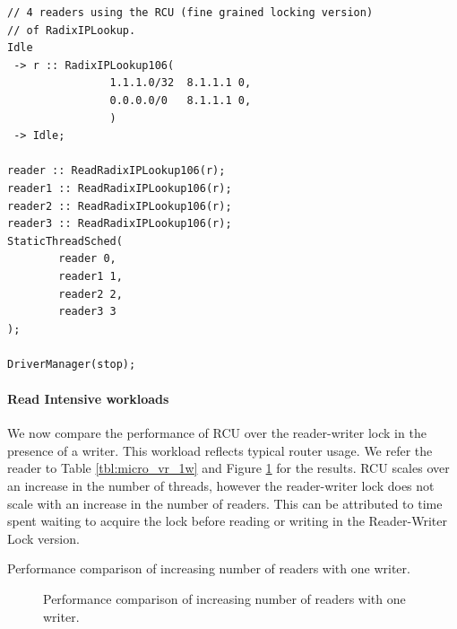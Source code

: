 \documentclass[12pt,a4paper]{article}
\begin{document}
\begin{lstlisting}[float=tph, caption = A Click configuration file for 4 readers, label =lst:readercomparison]
// 4 readers using the RCU (fine grained locking version)
// of RadixIPLookup.
Idle
 -> r :: RadixIPLookup106(
                1.1.1.0/32  8.1.1.1 0,
                0.0.0.0/0   8.1.1.1 0,
                ) 
 -> Idle;

reader :: ReadRadixIPLookup106(r);
reader1 :: ReadRadixIPLookup106(r);
reader2 :: ReadRadixIPLookup106(r);
reader3 :: ReadRadixIPLookup106(r);
StaticThreadSched(
        reader 0,
        reader1 1,
        reader2 2,
        reader3 3
);

DriverManager(stop);

\end{lstlisting}

\paragraph{Read Intensive workloads}
We now compare the performance of RCU over the reader-writer lock in the presence of a writer. This workload reflects typical router usage. We refer the reader to Table \ref{tbl:micro_vr_1w} and Figure \ref{img:micro_vr_1w} for the results.
RCU scales over an increase in the number of threads, however the reader-writer lock does not scale with an increase in the number of readers. This can be attributed to time spent waiting to acquire the lock before reading or writing in the Reader-Writer Lock version.

\begin{table}[tph]
\begin{center}

\end{center}
\label{tbl:micro_vr_1w}
\caption{Performance comparison of increasing number of readers with one writer.}
\end{table}

\begin{figure}[tph]
\begin{center}
\caption{Performance comparison of increasing number of readers with one writer.}
\label{img:micro_vr_1w}
\end{center}
\end{figure}
\end{document}
